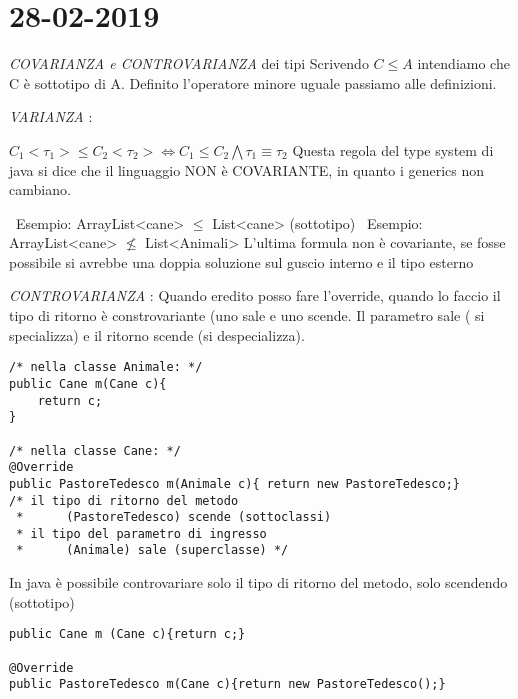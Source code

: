 

\newpage
\section{28-02-2019}
\textit{COVARIANZA e CONTROVARIANZA} dei tipi \newline
Scrivendo  $C \leq A$ intendiamo che C è sottotipo di A. Definito l'operatore minore uguale passiamo alle definizioni.

\noindent \textit{VARIANZA} : \newline

$C_{1} <\tau_{1}> \leq C_{2}<\tau_{2}> \Leftrightarrow C_{1} \leq C_{2} \bigwedge \tau_{1}\equiv \tau_{2} $
Questa regola del type system di java si dice che il linguaggio NON è COVARIANTE, in quanto i generics non cambiano. 

\noindent \textbullet\ Esempio: ArrayList<cane> $\leq$ List<cane> (sottotipo) \newline
\textbullet\ Esempio: ArrayList<cane> $\nleq$ List<Animali> \newline
L'ultima formula non è covariante, se fosse possibile si avrebbe una doppia soluzione sul guscio interno e il tipo esterno \newline

\noindent \textit{CONTROVARIANZA} : \newline
Quando eredito posso fare l'override, quando lo faccio il tipo di ritorno è constrovariante (uno sale e uno scende. Il parametro sale ( si specializza) e il ritorno scende (si despecializza). 

\begin{lstlisting}[basicstyle=\small,]
/* nella classe Animale: */
public Cane m(Cane c){
	return c;
}

/* nella classe Cane: */
@Override
public PastoreTedesco m(Animale c){ return new PastoreTedesco;}
/* il tipo di ritorno del metodo 
 *		(PastoreTedesco) scende (sottoclassi)
 * il tipo del parametro di ingresso 
 * 		(Animale) sale (superclasse) */
\end{lstlisting}
In java è possibile controvariare solo il tipo di ritorno del metodo, solo scendendo (sottotipo) \newline

\begin{lstlisting}[basicstyle=\small,]
public Cane m (Cane c){return c;}

@Override
public PastoreTedesco m(Cane c){return new PastoreTedesco();}
\end{lstlisting}

